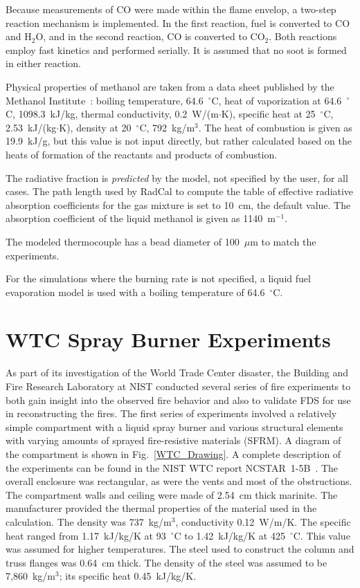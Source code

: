 Because measurements of CO were made within the flame envelop, a two-step reaction mechanism is implemented. In the first reaction, fuel is converted to CO and H$_2$O, and in the second reaction, CO is converted to CO$_2$. Both reactions employ fast kinetics and performed serially. It is assumed that no soot is formed in either reaction.

Physical properties of methanol are taken from a data sheet published by the Methanol Institute~\cite{Methanol}: boiling temperature, 64.6~$^\circ$C, heat of vaporization at 64.6~$^\circ$C, 1098.3~kJ/kg, thermal conductivity, 0.2~W/(m$\cdot$K), specific heat at 25~$^\circ$C, 2.53~kJ/(kg$\cdot$K), density at 20~$^\circ$C, 792~kg/m$^3$. The heat of combustion is given as 19.9~kJ/g, but this value is not input directly, but rather calculated based on the heats of formation of the reactants and products of combustion.

The radiative fraction is {\em predicted} by the model, not specified by the user, for all cases. The path length used by RadCal to compute the table of effective radiative absorption coefficients for the gas mixture is set to 10~cm, the default value. The absorption coefficient of the liquid methanol is given as 1140~m$^{-1}$.

The modeled thermocouple has a bead diameter of 100~$\mu$m to match the experiments.

For the simulations where the burning rate is not specified, a liquid fuel evaporation model is used with a boiling temperature of 64.6~$^\circ$C.


\section{WTC Spray Burner Experiments}
\label{WTC_Description}

As part of its investigation of the World Trade Center disaster, the Building and Fire Research Laboratory at NIST conducted several series of fire experiments to both gain insight into the observed fire behavior and also to validate FDS for use in reconstructing the fires. The first series of experiments involved a relatively simple compartment with a liquid spray burner and various structural elements with varying amounts of sprayed fire-resistive materials (SFRM). A diagram of the compartment is shown in Fig.~\ref{WTC_Drawing}. A complete description of the experiments can be found in the NIST WTC report NCSTAR~1-5B~\cite{NIST_NCSTAR_1-5B}. The overall enclosure was rectangular, as were the vents and most of the obstructions. The compartment walls and ceiling were made of 2.54~cm thick marinite. The manufacturer provided the thermal properties of the material used in the calculation. The density was 737~kg/m$^3$, conductivity 0.12~W/m/K. The specific heat ranged from 1.17~kJ/kg/K at 93~$^\circ$C to 1.42~kJ/kg/K at 425~$^\circ$C. This value was assumed for higher temperatures. The steel used to construct the column and truss flanges was 0.64~cm thick.  The density of the steel was assumed to be 7,860~kg/m$^3$; its specific heat 0.45~kJ/kg/K.

